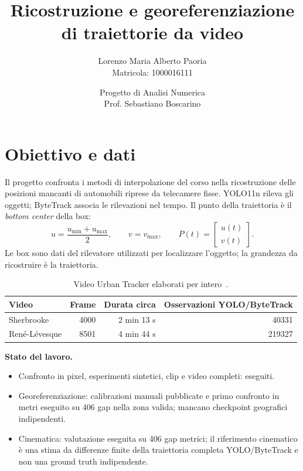 \documentclass[11pt,a4paper]{article}
\title{\color{blu}\bfseries Ricostruzione e georeferenziazione\\di traiettorie da video}
\author{Lorenzo Maria Alberto Paoria\\[3pt]\normalsize Matricola: 1000016111}
\date{\small Progetto di Analisi Numerica\\Prof. Sebastiano Boscarino}
\numberwithin{equation}{section}
\begin{document}
\maketitle
\thispagestyle{empty}

\section{Obiettivo e dati}

Il progetto confronta i metodi di interpolazione del corso nella
ricostruzione delle posizioni mancanti di automobili riprese da telecamere
fisse. YOLO11n rileva gli oggetti; ByteTrack associa le rilevazioni nel
tempo. Il punto della traiettoria è il \emph{bottom center} della box:
\begin{equation}
 u=\frac{u_{\min}+u_{\max}}{2},\qquad v=v_{\max},\qquad
 P(t)=\begin{bmatrix}u(t)\\v(t)\end{bmatrix}.
\end{equation}
Le box sono dati del rilevatore utilizzati per localizzare l'oggetto;
la grandezza da ricostruire è la traiettoria.

\begin{table}[htbp]
\centering
\caption{Video Urban Tracker elaborati per intero~\cite{urbantracker}.}
\begin{tabular}{lrrr}
\toprule
Video & Frame & Durata circa & Osservazioni YOLO/ByteTrack\\
\midrule
Sherbrooke & \num{4000} & 2 min 13 s & \num{40331}\\
René-Lévesque & \num{8501} & 4 min 44 s & \num{219327}\\
\bottomrule
\end{tabular}
\end{table}

\textbf{Stato del lavoro.}
\begin{itemize}
  \item Confronto in pixel, esperimenti sintetici, clip e video completi:
  eseguiti.
  \item Georeferenziazione: calibrazioni manuali pubblicate e primo
  confronto in metri eseguito su 406 gap nella zona valida; mancano
  checkpoint geografici indipendenti.
  \item Cinematica: valutazione eseguita su 406 gap metrici; il riferimento
  cinematico è una stima da differenze finite della traiettoria completa
  YOLO/ByteTrack e non una ground truth indipendente.
\end{itemize}
\end{document}
